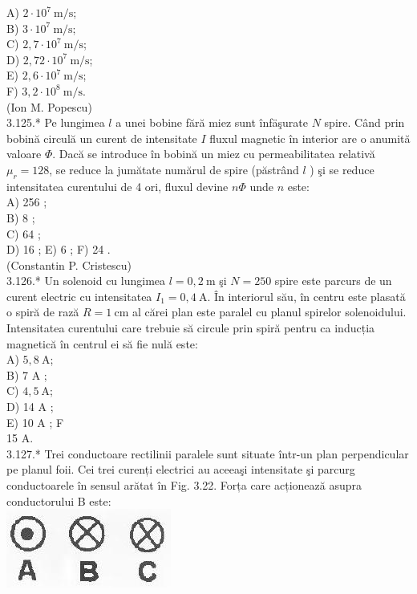 \documentclass[10pt]{article}
\begin{document}
A) $2 \cdot 10^{7} \mathrm{~m} / \mathrm{s}$;\\
B) $3 \cdot 10^{7} \mathrm{~m} / \mathrm{s}$;\\
C) $2,7 \cdot 10^{7} \mathrm{~m} / \mathrm{s}$;\\
D) $2,72 \cdot 10^{7} \mathrm{~m} / \mathrm{s}$;\\
E) $2,6 \cdot 10^{7} \mathrm{~m} / \mathrm{s}$;\\
F) $3,2 \cdot 10^{8} \mathrm{~m} / \mathrm{s}$.\\
(Ion M. Popescu)\\
3.125.* Pe lungimea $l$ a unei bobine fără miez sunt înfäşurate $N$ spire. Când prin bobină circulă un curent de intensitate $I$ fluxul magnetic în interior are o anumită valoare $\Phi$. Dacă se introduce în bobină un miez cu permeabilitatea relativă $\mu_{r}=128$, se reduce la jumătate numărul de spire (păstrând $l$ ) şi se reduce intensitatea curentului de 4 ori, fluxul devine $n \Phi$ unde $n$ este:\\
A) 256 ;\\
B) 8 ;\\
C) 64 ;\\
D) 16 ; E) 6 ; F) 24 .\\
(Constantin P. Cristescu)\\
3.126.* Un solenoid cu lungimea $l=0,2 \mathrm{~m}$ şi $N=250$ spire este parcurs de un curent electric cu intensitatea $I_{1}=0,4 \mathrm{~A}$. În interiorul său, în centru este plasată o spiră de rază $R=1 \mathrm{~cm}$ al cărei plan este paralel cu planul spirelor solenoidului. Intensitatea curentului care trebuie să circule prin spiră pentru ca inducția magnetică în centrul ei să fie nulă este:\\
A) $5,8 \mathrm{~A}$;\\
B) 7 A ;\\
C) $4,5 \mathrm{~A}$;\\
D) 14 A ;\\
E) 10 A ; F\\
15 A.\\
3.127.* Trei conductoare rectilinii paralele sunt situate într-un plan perpendicular pe planul foii. Cei trei curenți electrici au aceeaşi intensitate şi parcurg conductoarele în sensul arătat în Fig. 3.22. Forța care acționează asupra conductorului B este:\\
\includegraphics[max width=\textwidth, center]{2025_07_01_5b3ff9fa0d508c8e9f17g-171}
\end{document}
